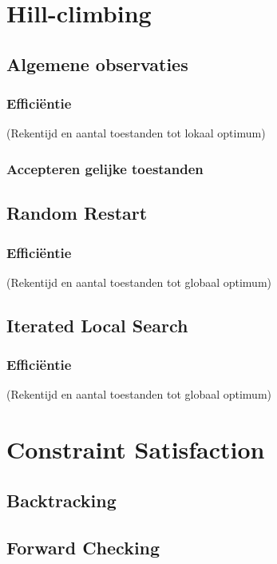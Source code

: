 \documentclass[]{report}
\begin{document}
\section{Hill-climbing}
\subsection{Algemene observaties}
\subsubsection{Effici\"{e}ntie}
(Rekentijd en aantal toestanden tot lokaal optimum)
\subsubsection{Accepteren gelijke toestanden}
\subsection{Random Restart}
\subsubsection{Effici\"{e}ntie}
(Rekentijd en aantal toestanden tot globaal optimum)
\subsection{Iterated Local Search}
\subsubsection{Effici\"{e}ntie}
(Rekentijd en aantal toestanden tot globaal optimum)
\section{Constraint Satisfaction}
\subsection{Backtracking}
\subsection{Forward Checking}
\end{document}
